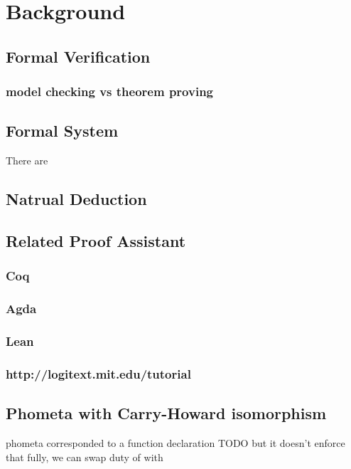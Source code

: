 

\chapter{Background}

\section{Formal Verification}
\subsection{model checking vs theorem proving}

\section{Formal System}
There are

\section{Natrual Deduction}

\section{Related Proof Assistant}
\subsection{Coq}
\subsection{Agda}
\subsection{Lean}
\subsection{http://logitext.mit.edu/tutorial}

\section{Phometa with Carry-Howard isomorphism}
phometa \kRule corresponded to a function declaration TODO
but it doesn't enforce that fully, we can swap duty of \kRule with \kDefinition